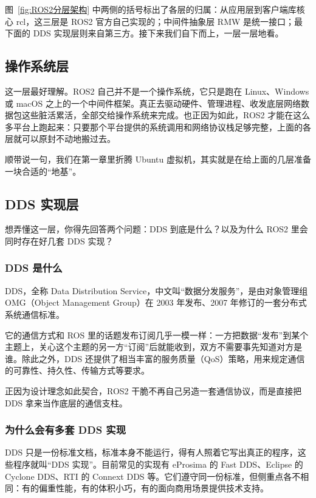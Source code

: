 \documentclass[12pt,a4paper]{ctexbook}
\begin{document}
图~\ref{fig:ROS2分层架构} 中两侧的括号标出了各层的归属：从应用层到客户端库核心 rcl，这三层是 ROS2 官方自己实现的；中间件抽象层 RMW 是统一接口；最下面的 DDS 实现层则来自第三方。接下来我们自下而上，一层一层地看。



\subsection{操作系统层}
这一层最好理解。ROS2 自己并不是一个操作系统，它只是跑在 Linux、Windows 或 macOS 之上的一个中间件框架。真正去驱动硬件、管理进程、收发底层网络数据包这些脏活累活，全部交给操作系统来完成。也正因为如此，ROS2 才能在这么多平台上跑起来：只要那个平台提供的系统调用和网络协议栈足够完整，上面的各层就可以原封不动地搬过去。

顺带说一句，我们在第一章里折腾 Ubuntu 虚拟机，其实就是在给上面的几层准备一块合适的“地基”。

\subsection{DDS 实现层}
想弄懂这一层，你得先回答两个问题：DDS 到底是什么？以及为什么 ROS2 里会同时存在好几套 DDS 实现？

\subsubsection{DDS 是什么}

DDS，全称 Data Distribution Service，中文叫“数据分发服务”，是由对象管理组 OMG（Object Management Group）在 2003 年发布、2007 年修订的一套分布式系统通信标准。

它的通信方式和 ROS 里的话题发布订阅几乎一模一样：一方把数据“发布”到某个主题上，关心这个主题的另一方“订阅”后就能收到，双方不需要事先知道对方是谁。除此之外，DDS 还提供了相当丰富的服务质量（QoS）策略，用来规定通信的可靠性、持久性、传输方式等要求。

正因为设计理念如此契合，ROS2 干脆不再自己另造一套通信协议，而是直接把 DDS 拿来当作底层的通信支柱。

\subsubsection{为什么会有多套 DDS 实现}

DDS 只是一份标准文档，标准本身不能运行，得有人照着它写出真正的程序，这些程序就叫“DDS 实现”。目前常见的实现有 eProsima 的 Fast DDS、Eclipse 的 Cyclone DDS、RTI 的 Connext DDS 等。它们遵守同一份标准，但侧重点各不相同：有的偏重性能，有的体积小巧，有的面向商用场景提供技术支持。
\end{document}
